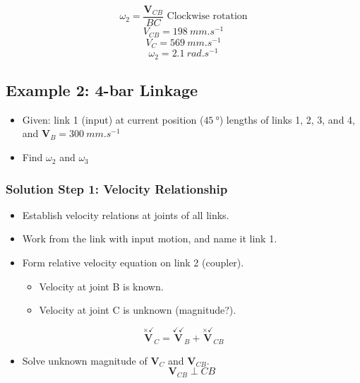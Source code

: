 \documentclass[11pt]{article}
\begin{document}
\[\omega_2 = \frac{\boldsymbol{V}_{CB}}{BC} \text{ Clockwise rotation}\]
\[V_{CB} = \qty{198}{mm.s^{-1}}\]
\[V_{C} = \qty{569}{mm.s^{-1}}\]
\[\omega_2 = \qty{2.1}{rad.s^{-1}}\]

 \newpage
\subsection{Example 2: 4-bar Linkage}
\label{sec:orga04d61b}
\begin{itemize}
\item Given: link 1 (input) at current position (\(\qty{45}{\degree}\)) lengths of links 1, 2, 3, and 4, and \(\boldsymbol{V}_B = \qty{300}{mm.s^{-1}}\)
\item Find \(\omega_2\) and \(\omega_3\)
\end{itemize}
\subsubsection{Solution Step 1: Velocity Relationship}
\label{sec:org7763dea}
\begin{itemize}
\item Establish velocity relations at joints of all links.
\item Work from the link with input motion, and name it link 1.
\item Form relative velocity equation on link 2 (coupler).
\begin{itemize}
\item Velocity at joint B is known.
\item Velocity at joint C is unknown (magnitude?).
\end{itemize}
\end{itemize}
\[\overset{\times \checkmark}{\boldsymbol{V}}_C = \overset{\checkmark \checkmark}{\boldsymbol{V}}_B + \overset{\times \checkmark}{\boldsymbol{V}}_{CB}\]

\begin{itemize}
\item Solve unknown magnitude of \(\boldsymbol{V}_C\) and \(\boldsymbol{V}_{CB}\).
\[\boldsymbol{V}_{CB} \perp CB\]
\end{itemize}

 \newpage
\end{document}
